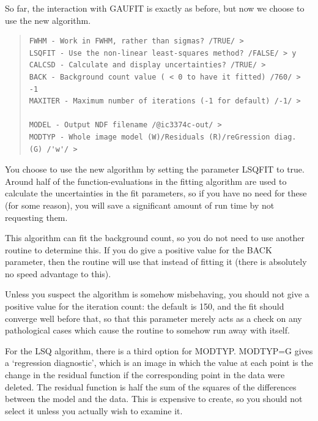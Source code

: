 \documentclass[twoside,11pt]{article}
\newenvironment{myquote}{\begin{quote}\begin{small}}{\end{small}\end{quote}}
\begin{document}
So far, the interaction with GAUFIT is exactly as before, but now we
choose to use the new algorithm.

\begin{myquote}
\begin{verbatim}
FWHM - Work in FWHM, rather than sigmas? /TRUE/ > 
LSQFIT - Use the non-linear least-squares method? /FALSE/ > y
CALCSD - Calculate and display uncertainties? /TRUE/ > 
BACK - Background count value ( < 0 to have it fitted) /760/ > -1
MAXITER - Maximum number of iterations (-1 for default) /-1/ > 

MODEL - Output NDF filename /@ic3374c-out/ > 
MODTYP - Whole image model (W)/Residuals (R)/reGression diag. (G) /'w'/ > 
\end{verbatim}
\end{myquote}

You choose to use the new algorithm by setting the parameter LSQFIT to
true.  Around half of the function-evaluations in the fitting
algorithm are used to calculate the uncertainties in the fit
parameters, so if you have no need for these (for some reason), you
will save a significant amount of run time by not requesting them.

This algorithm can fit the background count, so you do not need to use
another routine to determine this.  If you do give a positive value
for the BACK parameter, then the routine will use that instead of
fitting it (there is absolutely no speed advantage to this).

Unless you suspect the algorithm is somehow misbehaving, you should
not give a positive value for the iteration count: the default is 150,
and the fit should converge well before that, so that this parameter
merely acts as a check on any pathological cases which cause the
routine to somehow run away with itself.

For the LSQ algorithm, there is a third option for MODTYP.  MODTYP=G
gives a `regression diagnostic', which is an image in which the value
at each point is the change in the residual function if the
corresponding point in the data were deleted.  The residual function
is half the sum of the squares of the differences between the model
and the data.  This is expensive to create, so you should not 
select it unless you actually wish to examine it.
\end{document}
